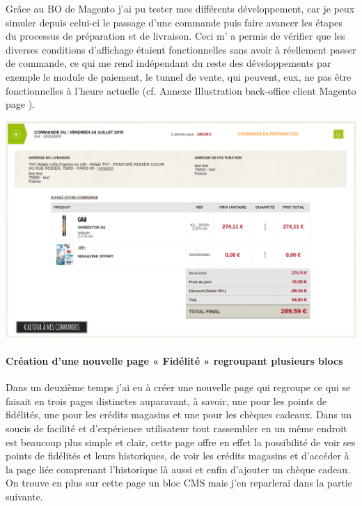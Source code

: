 \documentclass[a4paper,11pt,twoside]{report}
\begin{document}
    	Grâce au BO de Magento j'ai pu tester mes différents développement, car je peux simuler depuis celui-ci le passage d'une commande puis faire avancer les étapes du processus de préparation et de livraison. Ceci m' a permis de vérifier que les diverses conditions d'affichage étaient fonctionnelles sans avoir à réellement passer de commande, ce qui me rend indépendant du reste des développements par exemple le module de paiement, le tunnel de vente, qui peuvent, eux, ne pas être fonctionnelles à l'heure actuelle (cf. Annexe Illustration back-office client Magento page \pageref{SL_BO_customer}).
	
	\begin{center}
	  \includegraphics[width=\textwidth]{images/SL_command_detail1.png} 
	  \label{SL_command_detail1}
	\end{center}
    	\paragraph*{Création d'une nouvelle page « Fidélité » regroupant plusieurs blocs}
    	Dans un deuxième temps j'ai eu à créer une nouvelle page qui regroupe ce qui se faisait en trois pages distinctes auparavant, à savoir, une pour les points de fidélités, une pour les crédits magasins et une pour les chèques cadeaux. Dans un soucis de facilité et d'expérience utilisateur tout rassembler en un même endroit est beaucoup plus simple et clair, cette page offre en effet la possibilité de voir ses points de fidélités et leurs historiques, de voir les crédits magasins et d'accéder à la page liée comprenant l'historique là aussi et enfin d'ajouter un chèque cadeau. On trouve en plus sur cette page un bloc CMS mais j'en reparlerai dans la partie suivante.
    
\end{document}
